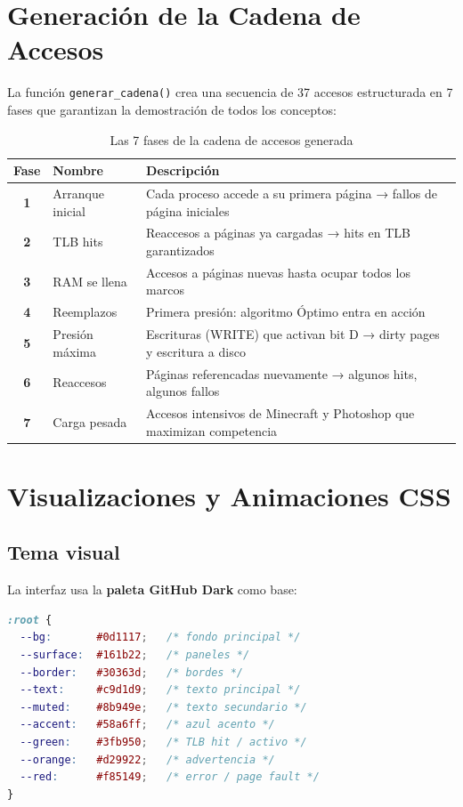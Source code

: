 \documentclass[12pt,a4paper]{article}
\begin{document}
\newpage

\section{Generación de la Cadena de Accesos}

La función \texttt{generar\_cadena()} crea una secuencia de 37 accesos estructurada en
7 fases que garantizan la demostración de todos los conceptos:

\begin{table}[H]
\centering
\begin{tabular}{>{\bfseries}clp{7cm}}
\toprule
Fase & Nombre & Descripción \\
\midrule
1 & Arranque inicial   & Cada proceso accede a su primera página → fallos de página iniciales \\
2 & TLB hits           & Reaccesos a páginas ya cargadas → hits en TLB garantizados \\
3 & RAM se llena       & Accesos a páginas nuevas hasta ocupar todos los marcos \\
4 & Reemplazos         & Primera presión: algoritmo Óptimo entra en acción \\
5 & Presión máxima     & Escrituras (WRITE) que activan bit D → dirty pages y escritura a disco \\
6 & Reaccesos          & Páginas referencadas nuevamente → algunos hits, algunos fallos \\
7 & Carga pesada       & Accesos intensivos de Minecraft y Photoshop que maximizan competencia \\
\bottomrule
\end{tabular}
\caption{Las 7 fases de la cadena de accesos generada}
\end{table}

\newpage

\section{Visualizaciones y Animaciones CSS}

\subsection{Tema visual}

La interfaz usa la \textbf{paleta GitHub Dark} como base:

\begin{lstlisting}[language=css, caption=Variables CSS del tema oscuro]
:root {
  --bg:       #0d1117;   /* fondo principal */
  --surface:  #161b22;   /* paneles */
  --border:   #30363d;   /* bordes */
  --text:     #c9d1d9;   /* texto principal */
  --muted:    #8b949e;   /* texto secundario */
  --accent:   #58a6ff;   /* azul acento */
  --green:    #3fb950;   /* TLB hit / activo */
  --orange:   #d29922;   /* advertencia */
  --red:      #f85149;   /* error / page fault */
}
\end{lstlisting}
\end{document}
